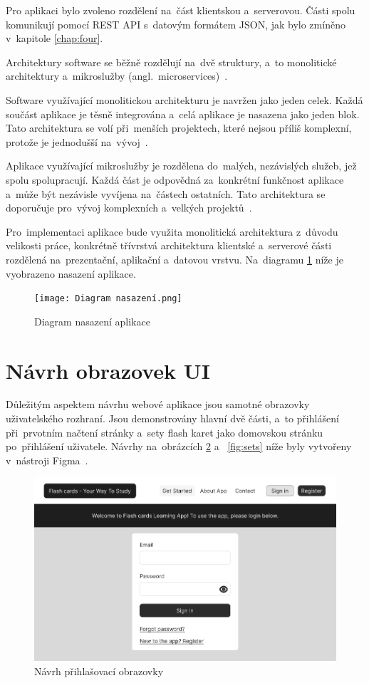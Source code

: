 \documentclass[twoside]{ctuthesis}
\begin{document}
Pro aplikaci bylo zvoleno rozdělení na~část klientskou a~serverovou. Části spolu komunikují pomocí REST API s~datovým formátem JSON, jak bylo zmíněno v~kapitole \ref{chap:four}.

Architektury software se běžně rozdělují na~dvě struktury, a~to monolitické architektury a~mikroslužby (angl.~microservices)~\cite{monomicro}.

Software využívající monolitickou architekturu je navržen jako jeden celek. Každá součást aplikace je těsně integrována a~celá aplikace je nasazena jako jeden blok. Tato architektura se volí při~menších projektech, které nejsou příliš komplexní, protože je jednodušší na~vývoj~\cite{monomicro}.

Aplikace využívající mikroslužby je rozdělena do~malých, nezávislých služeb, jež spolu spolupracují. Každá část je odpovědná za~konkrétní funkčnost aplikace a~může být nezávisle vyvíjena na~částech ostatních. Tato architektura se doporučuje pro~vývoj komplexních a~velkých projektů~\cite{monomicro}.

Pro~implementaci aplikace bude využita monolitická architektura z~důvodu velikosti práce, konkrétně třívrstvá architektura klientské a~serverové části rozdělená na~prezentační, aplikační a~datovou vrstvu. Na~diagramu \ref{fig:dd} níže je vyobrazeno nasazení aplikace.

\begin{figure}[H]
\centering
\texttt{[image: Diagram nasazení.png]}
\caption{Diagram nasazení aplikace}
\label{fig:dd}
\end{figure}

\newpage

\section{Návrh obrazovek UI}

Důležitým aspektem návrhu webové aplikace jsou samotné obrazovky uživatelského rozhraní. Jsou demonstrovány hlavní dvě části, a~to přihlášení při~prvotním načtení stránky a~sety flash karet jako domovskou stránku po~přihlášení uživatele. Návrhy na~obrázcích \ref{fig:login} a~ \ref{fig:sets} níže byly vytvořeny v~nástroji Figma~\cite{figma}.

\begin{figure}[H]
\centering
\includegraphics[width=1.1\textwidth, height=0.36\textheight]{Login.png}
\caption{Návrh přihlašovací obrazovky}
\label{fig:login}
\end{figure}
\end{document}
